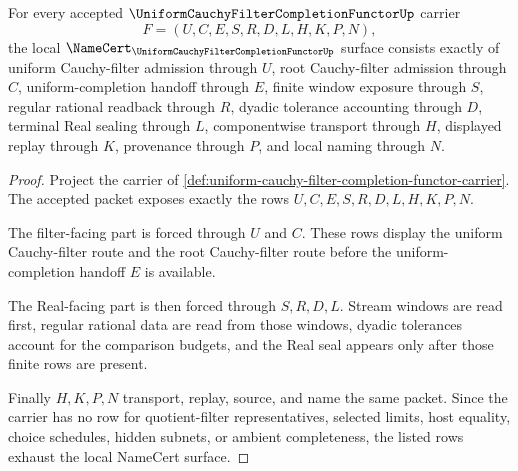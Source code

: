 \begin{theorem}
\label{thm:uniform-cauchy-filter-completion-functor-namecert-obligations}
For every accepted $\UniformCauchyFilterCompletionFunctorUp$ carrier
$$
F=(U,C,E,S,R,D,L,H,K,P,N),
$$
the local $\NameCert_{\UniformCauchyFilterCompletionFunctorUp}$ surface consists exactly of uniform Cauchy-filter admission through $U$, root Cauchy-filter admission through $C$, uniform-completion handoff through $E$, finite window exposure through $S$, regular rational readback through $R$, dyadic tolerance accounting through $D$, terminal Real sealing through $L$, componentwise transport through $H$, displayed replay through $K$, provenance through $P$, and local naming through $N$.
\end{theorem}
\begin{proof}
Project the carrier of \autoref{def:uniform-cauchy-filter-completion-functor-carrier}. The accepted packet exposes exactly the rows $U,C,E,S,R,D,L,H,K,P,N$.

The filter-facing part is forced through $U$ and $C$. These rows display the uniform Cauchy-filter route and the root Cauchy-filter route before the uniform-completion handoff $E$ is available.

The Real-facing part is then forced through $S,R,D,L$. Stream windows are read first, regular rational data are read from those windows, dyadic tolerances account for the comparison budgets, and the Real seal appears only after those finite rows are present.

Finally $H,K,P,N$ transport, replay, source, and name the same packet. Since the carrier has no row for quotient-filter representatives, selected limits, host equality, choice schedules, hidden subnets, or ambient completeness, the listed rows exhaust the local NameCert surface.
\end{proof}

